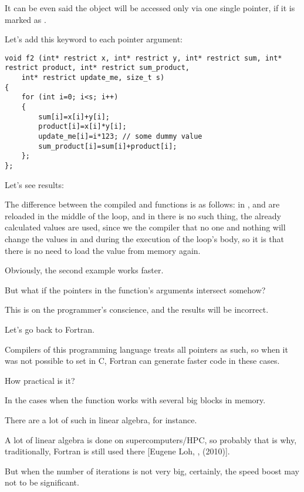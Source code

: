 It can be even said the object will be accessed
only via one single pointer, if it is marked as .

Let's add this keyword to each pointer argument:

\begin{lstlisting}
void f2 (int* restrict x, int* restrict y, int* restrict sum, int* restrict product, int* restrict sum_product, 
	int* restrict update_me, size_t s)
{
	for (int i=0; i<s; i++)
	{
		sum[i]=x[i]+y[i];
		product[i]=x[i]*y[i];
		update_me[i]=i*123; // some dummy value
		sum_product[i]=sum[i]+product[i];	
	};
};
\end{lstlisting}

Let's see results:





The difference between the compiled  and  functions is as follows:
in ,  and  
are reloaded in the middle of the loop,
and in  
there is no such thing,
the already calculated values are used, 
since we  the compiler 
that no one and nothing will change the values in  
and  during the execution of the loop's body, 
so it is  that there is no need to load the value from memory again.

Obviously, the second example works faster.

But what if the pointers in the function's arguments intersect somehow?

This is on the programmer's conscience, and the results will be incorrect.

Let's go back to Fortran. 

Compilers of this programming language treats all pointers as such, 
so when it was not possible to set  in C, Fortran can generate faster code in these cases.

How practical is it? 

In the cases when the function works with several big blocks in memory.

There are a lot of such in linear algebra, for instance.

A lot of linear algebra is done on supercomputers/\ac{HPC}, so probably that is why, traditionally, Fortran is still
used there [Eugene Loh, , (2010)].

But when the number of iterations is not very big,
certainly, the speed boost may not to be significant.
